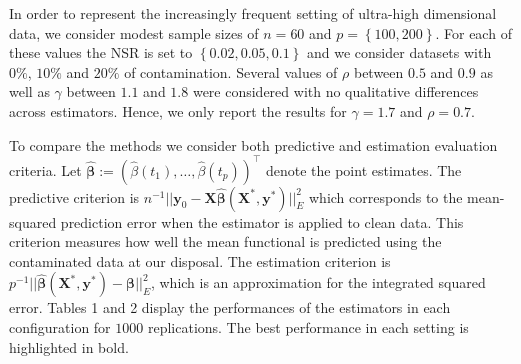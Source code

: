 \documentclass[11pt]{article}
\begin{document}
In order to represent the increasingly frequent setting of ultra-high dimensional data, we consider modest sample sizes of $n=60$ and $p= \left\{ 100, 200 \right\}$. For each of these values the NSR is set to $\left\{0.02, 0.05, 0.1 \right\}$ and we consider datasets with $0\%$, $10\%$ and $20\%$ of contamination. Several values of $\rho$ between $0.5$ and $0.9$ as well as $\gamma$ between $1.1$ and $1.8$ were considered with no qualitative differences across estimators. Hence, we only report the results for $\gamma = 1.7$ and $\rho = 0.7$. 

To compare the methods we consider both predictive and estimation evaluation criteria. Let $\boldsymbol{\widehat{\beta}} := ( \widehat{\beta}(t_1), \ldots, \widehat{\beta}(t_p) )^{\top}$ denote the point estimates. The predictive criterion is $n^{-1} ||\mathbf{y}_0 - \mathbf{X} \boldsymbol{\widehat{\beta}} (\mathbf{X^{*}}, \mathbf{y}^{*}) ||^2_{E} $ which corresponds to the mean-squared prediction error when the estimator is applied to clean data. This criterion measures how well the mean functional is predicted using the contaminated data at our disposal. The estimation criterion is $p^{-1} || \boldsymbol{\widehat{\beta}}(\mathbf{X^{*}}, \mathbf{y}^{*}) - \boldsymbol{\beta}||^2_{E}$, which is an approximation for the integrated squared error. Tables 1 and 2 display the performances of the estimators in each configuration for $1000$ replications. The best performance in each setting is highlighted in bold.
\end{document}
